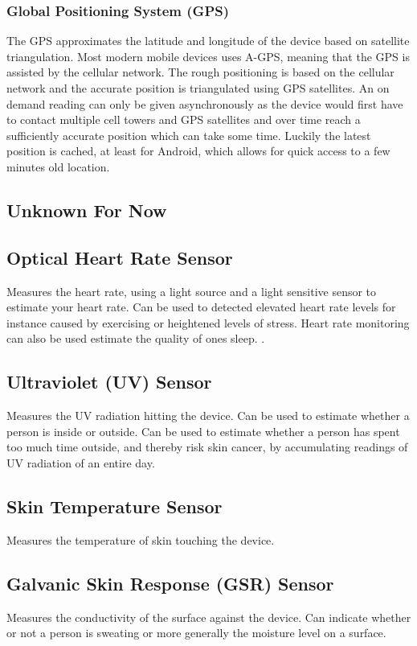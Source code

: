 \subsubsection{Global Positioning System (GPS)}
\label{sub:gps}
The GPS approximates the latitude and longitude of the device based on satellite triangulation. Most modern mobile devices uses A-GPS, meaning that the GPS is assisted by the cellular network. The rough positioning is based on the cellular network and the accurate position is triangulated using GPS satellites. An on demand reading can only be given asynchronously as the device would first have to contact multiple cell towers and GPS satellites and over time reach a sufficiently accurate position which can take some time. Luckily the latest position is cached, at least for Android, which allows for quick access to a few minutes old location. 

\subsection{Unknown For Now}
\label{sub:unknown_for_now}

\subsection{Optical Heart Rate Sensor}
\label{sub:optical_heart_rate_sensor}
Measures the heart rate, using a light source and a light sensitive sensor to estimate your heart rate. Can be used to detected elevated heart rate levels for instance caused by exercising or heightened levels of stress. Heart rate monitoring can also be used estimate the quality of ones sleep. \parencite{guardian_fitness_tracker_rem_sleep}. 

\subsection{Ultraviolet (UV) Sensor}
\label{sub:uv_sensor}
Measures the UV radiation hitting the device. Can be used to estimate whether a person is inside or outside. Can be used to estimate whether a person has spent too much time outside, and thereby risk skin cancer, by accumulating readings of UV radiation of an entire day.   

\subsection{Skin Temperature Sensor}
\label{sub:skin_temperature_sensor}
Measures the temperature of skin touching the device.  

\subsection{Galvanic Skin Response (GSR) Sensor}
\label{sub:galvanic_skin_respons_sensor}
Measures the conductivity of the surface against the device. Can indicate whether or not a person is sweating or more generally the moisture level on a surface. 

